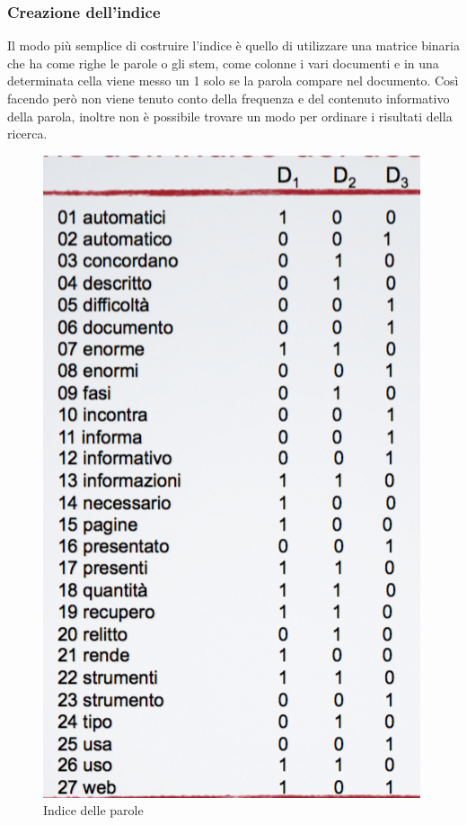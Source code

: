 \subsubsection{Creazione dell'indice}

Il modo più semplice di costruire l'indice è quello di utilizzare una matrice binaria che ha come righe le parole o gli stem, come colonne i vari documenti e in una determinata cella viene messo un 1 solo se la parola compare nel documento.
Così facendo però non viene tenuto conto della frequenza e del contenuto informativo della parola, inoltre non è possibile trovare un modo per ordinare i risultati della ricerca.

\begin{figure}[ht]
\centering
\begin{minipage}[b]{0.45\linewidth}
		\centering
  \includegraphics[width=0.7\linewidth]{images/l5-index-1}
  \caption{Indice delle parole}


\end{minipage}
\end{figure}
